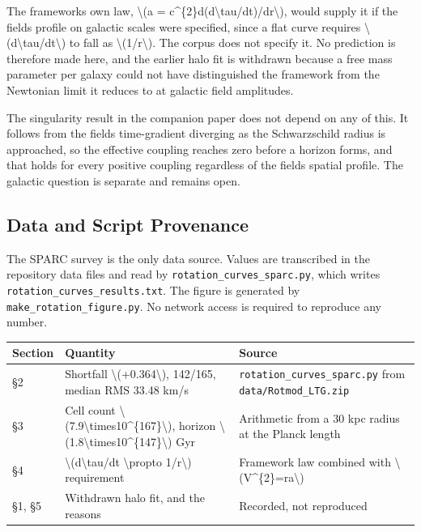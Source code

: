 \documentclass[
  10pt,
]{article}
\begin{document}
The framework\textquotesingle s own law, \textbackslash(a =
c\^{}\{2\}d(d\textbackslash tau/dt)/dr\textbackslash), would supply it
if the field\textquotesingle s profile on galactic scales were
specified, since a flat curve requires
\textbackslash(d\textbackslash tau/dt\textbackslash) to fall as
\textbackslash(1/r\textbackslash). The corpus does not specify it. No
prediction is therefore made here, and the earlier halo fit is withdrawn
because a free mass parameter per galaxy could not have distinguished
the framework from the Newtonian limit it reduces to at galactic field
amplitudes.

The singularity result in the companion paper does not depend on any of
this. It follows from the field\textquotesingle s time-gradient
diverging as the Schwarzschild radius is approached, so the effective
coupling reaches zero before a horizon forms, and that holds for every
positive coupling regardless of the field\textquotesingle s spatial
profile. The galactic question is separate and remains open.

\hypertarget{data-and-script-provenance}{%
\subsection{Data and Script
Provenance}\label{data-and-script-provenance}}

The SPARC survey is the only data source. Values are transcribed in the
repository data files and read by \texttt{rotation\_curves\_sparc.py},
which writes \texttt{rotation\_curves\_results.txt}. The figure is
generated by \texttt{make\_rotation\_figure.py}. No network access is
required to reproduce any number.

\begin{longtable}[]{@{}lll@{}}
\toprule\noalign{}
Section & Quantity & Source \\
\midrule\noalign{}
\endhead
\bottomrule\noalign{}
\endlastfoot
§2 & Shortfall \textbackslash(+0.364\textbackslash), 142/165, median RMS
33.48 km/s & \texttt{rotation\_curves\_sparc.py} from
\texttt{data/Rotmod\_LTG.zip} \\
§3 & Cell count
\textbackslash(7.9\textbackslash times10\^{}\{167\}\textbackslash),
horizon
\textbackslash(1.8\textbackslash times10\^{}\{147\}\textbackslash) Gyr &
Arithmetic from a 30 kpc radius at the Planck length \\
§4 & \textbackslash(d\textbackslash tau/dt \textbackslash propto
1/r\textbackslash) requirement & Framework law combined with
\textbackslash(V\^{}\{2\}=ra\textbackslash) \\
§1, §5 & Withdrawn halo fit, and the reasons & Recorded, not
reproduced \\
\end{longtable}
\end{document}
